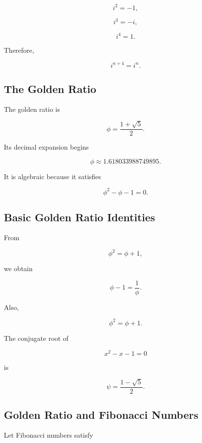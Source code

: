 \[
\boxed{
i^2=-1,
}
\]

\[
\boxed{
i^3=-i,
}
\]

\[
\boxed{
i^4=1.
}
\]

Therefore,

\[
\boxed{
i^{n+4}=i^n.
}
\]

\subsection{The Golden Ratio}
\label{subsec:golden-ratio-reference}

The golden ratio is

\[
\boxed{
\phi
=
\frac{1+\sqrt5}{2}.
}
\]

Its decimal expansion begins

\[
\boxed{
\phi
\approx
1.618033988749895.
}
\]

It is algebraic because it satisfies

\[
\boxed{
\phi^2-\phi-1=0.
}
\]

\subsection{Basic Golden Ratio Identities}
\label{subsec:golden-ratio-identities}

From

\[
\phi^2=\phi+1,
\]

we obtain

\[
\boxed{
\phi-1
=
\frac1\phi.
}
\]

Also,

\[
\boxed{
\phi^2
=
\phi+1.
}
\]

The conjugate root of

\[
x^2-x-1=0
\]

is

\[
\boxed{
\psi
=
\frac{1-\sqrt5}{2}.
}
\]

\subsection{Golden Ratio and Fibonacci Numbers}
\label{subsec:golden-ratio-fibonacci}

Let Fibonacci numbers satisfy

